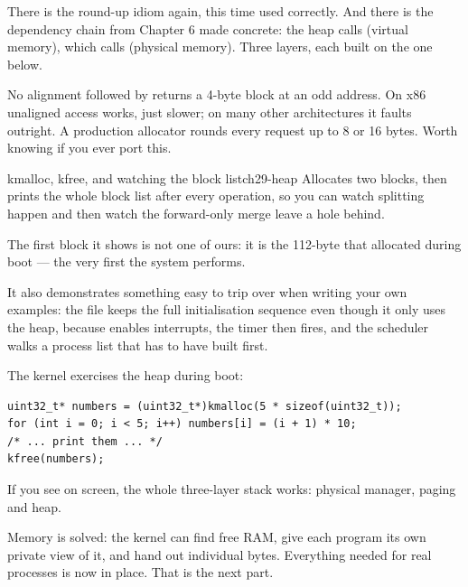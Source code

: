 There is the round-up idiom again, this time used correctly. And there is the dependency chain from
Chapter 6 made concrete: the heap calls  (virtual memory), which calls
 (physical memory). Three layers, each built on the one below.

\begin{warn}{No alignment}
 followed by  returns a 4-byte block at an odd address. On x86
unaligned access works, just slower; on many other architectures it faults outright. A production
allocator rounds every request up to 8 or 16 bytes. Worth knowing if you ever port this.
\end{warn}

\begin{recipe}{kmalloc, kfree, and watching the block list}{ch29-heap}
Allocates two blocks, then prints the whole block list after every operation, so you can watch
splitting happen and then watch the forward-only merge leave a hole behind.

The first block it shows is not one of ours: it is the 112-byte  that
 allocated during boot --- the very first  the system performs.

It also demonstrates something easy to trip over when writing your own examples: the file keeps the
full initialisation sequence even though it only uses the heap, because  enables
interrupts, the timer then fires, and the scheduler walks a process list that
 has to have built first.
\end{recipe}

\begin{tryit}
The kernel exercises the heap during boot:
\begin{lstlisting}[style=c]
uint32_t* numbers = (uint32_t*)kmalloc(5 * sizeof(uint32_t));
for (int i = 0; i < 5; i++) numbers[i] = (i + 1) * 10;
/* ... print them ... */
kfree(numbers);
\end{lstlisting}
If you see  on screen, the whole three-layer stack works: physical
manager, paging and heap.
\end{tryit}

\begin{summary}
Memory is solved: the kernel can find free RAM, give each program its own private view of it, and
hand out individual bytes. Everything needed for real processes is now in place. That is the next
part.
\end{summary}
